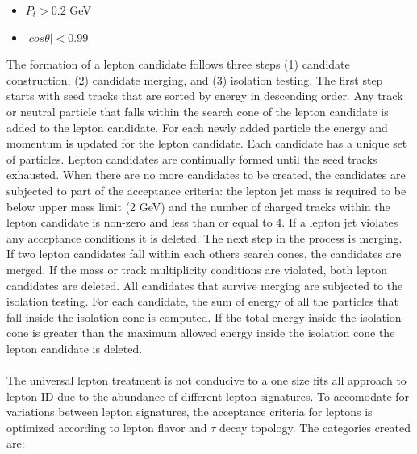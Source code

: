 \begin{itemize}
\item $P_t > 0.2$ GeV
\item $|cos\theta| < 0.99$
\end{itemize}
The formation of a lepton candidate follows three steps (1) candidate construction, (2) candidate merging, and (3) isolation testing.
The first step starts with seed tracks that are sorted by energy in descending order. Any track or neutral particle that falls within the search cone of the lepton candidate is added to the lepton candidate. For each newly added particle the energy and momentum is updated for the lepton candidate. Each candidate has a unique set of particles. Lepton candidates are continually formed until the seed tracks exhausted. When there are no more candidates to be created, the candidates are subjected to part of the acceptance criteria: the lepton jet mass is required to be below upper mass limit (2 GeV) and the number of charged tracks within the lepton candidate is non-zero and less than or equal to 4. If a lepton jet violates any acceptance conditions it is deleted. The next step in the process is merging. If two lepton candidates fall within each others search cones, the candidates are merged. If the mass or track multiplicity conditions are violated, both lepton candidates are deleted.  All  candidates that survive merging are subjected to the isolation testing. For each candidate, the sum of energy of all the particles that fall inside the isolation cone is computed. If the total energy inside the isolation cone is greater than the maximum allowed energy inside the isolation cone the lepton candidate is deleted.\\
\quad \quad \\
The universal lepton treatment is not conducive to a one size fits all approach to lepton ID due to the abundance of different lepton signatures. To accomodate for variations between lepton signatures, the acceptance criteria for leptons is optimized according to lepton flavor and $\tau$ decay topology. The categories created are:\\

